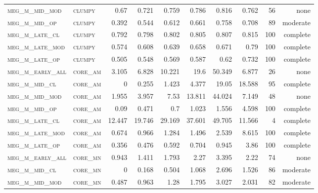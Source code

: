 \begin{landscape}
\begin{center}
\begin{footnotesize}
\begin{longtable}{llrrrrr|rrr}
\textsc{meg\_m\_mid\_mod  } & \textsc{clumpy    }   & 0.67     & 0.721    & 0.759    & 0.786    & 0.816    & 0.762    & 56  & none     \\
\textsc{meg\_m\_mid\_op   } & \textsc{clumpy    }   & 0.392    & 0.544    & 0.612    & 0.661    & 0.758    & 0.708    & 89  & moderate \\
\textsc{meg\_m\_late\_cl  } & \textsc{clumpy    }   & 0.792    & 0.798    & 0.802    & 0.805    & 0.807    & 0.815    & 100 & complete \\
\textsc{meg\_m\_late\_mod } & \textsc{clumpy    }   & 0.574    & 0.608    & 0.639    & 0.658    & 0.671    & 0.79     & 100 & complete \\
\textsc{meg\_m\_late\_op  } & \textsc{clumpy    }   & 0.505    & 0.548    & 0.569    & 0.587    & 0.62     & 0.732    & 100 & complete \\
\textsc{meg\_m\_early\_all} & \textsc{core\_am  }   & 3.105    & 6.828    & 10.221   & 19.6     & 50.349   & 6.877    & 26  & none     \\
\textsc{meg\_m\_mid\_cl   } & \textsc{core\_am  }   & 0        & 0.255    & 1.423    & 4.377    & 19.05    & 18.588   & 95  & complete \\
\textsc{meg\_m\_mid\_mod  } & \textsc{core\_am  }   & 1.955    & 3.957    & 7.53     & 13.811   & 44.024   & 7.149    & 48  & none     \\
\textsc{meg\_m\_mid\_op   } & \textsc{core\_am  }   & 0.09     & 0.471    & 0.7      & 1.023    & 1.556    & 4.598    & 100 & complete \\
\textsc{meg\_m\_late\_cl  } & \textsc{core\_am  }   & 12.447   & 19.746   & 29.169   & 37.601   & 49.705   & 11.566   & 4   & complete \\
\textsc{meg\_m\_late\_mod } & \textsc{core\_am  }   & 0.674    & 0.966    & 1.284    & 1.496    & 2.539    & 8.615    & 100 & complete \\
\textsc{meg\_m\_late\_op  } & \textsc{core\_am  }   & 0.356    & 0.476    & 0.592    & 0.704    & 0.945    & 3.86     & 100 & complete \\
\textsc{meg\_m\_early\_all} & \textsc{core\_mn  }   & 0.943    & 1.411    & 1.793    & 2.27     & 3.395    & 2.22     & 74  & none     \\
\textsc{meg\_m\_mid\_cl   } & \textsc{core\_mn  }   & 0        & 0.168    & 0.504    & 1.068    & 2.696    & 1.526    & 86  & moderate \\
\textsc{meg\_m\_mid\_mod  } & \textsc{core\_mn  }   & 0.487    & 0.963    & 1.28     & 1.795    & 3.027    & 2.031    & 82  & moderate \\

\end{longtable}
\end{footnotesize}
\end{center}
\end{landscape}
